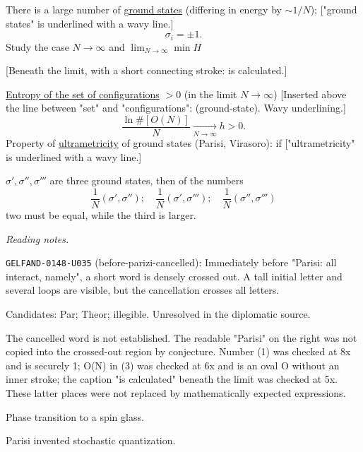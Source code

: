 There is a large number of \underline{ground states}
(differing in energy by $\sim1/N$);
["ground states" is underlined with a wavy line.]
\begin{equation*}
\sigma_i=\pm1.
\end{equation*}
Study the case $N\to\infty$ and $\displaystyle\lim_{N\to\infty}\min H$

[Beneath the limit, with a short connecting stroke: is calculated.]

\underline{Entropy of the set of configurations} $>0$ (in the limit $N\to\infty$)
[Inserted above the line between "set" and "configurations": (ground-state). Wavy underlining.]
\begin{equation*}
\frac{\ln\# [O(N)]}{N}\underset{N\to\infty}{\longrightarrow}h>0. \tag{3}
\end{equation*}
Property of \underline{ultrametricity} of ground states (Parisi, Virasoro): if
["ultrametricity" is underlined with a wavy line.]

$\sigma',\sigma'',\sigma'''$ are three ground states, then of the numbers
\begin{equation*}
\frac1N(\sigma',\sigma'');\quad
\frac1N(\sigma',\sigma''');\quad
\frac1N(\sigma'',\sigma''') \tag{4}
\end{equation*}
two must be equal, while the third is larger.

\par\smallskip\noindent\textit{Reading notes.}\par
\noindent\texttt{GELFAND-0148-U035} (before-parizi-cancelled): Immediately before "Parisi: all interact, namely", a short word is densely crossed out. A tall initial letter and several loops are visible, but the cancellation crosses all letters.\par
Candidates: Par; Theor; illegible. Unresolved in the diplomatic source.\par
The cancelled word is not established. The readable "Parisi" on the right was not copied into the crossed-out region by conjecture. Number (1) was checked at 8x and is securely 1; O(N) in (3) was checked at 6x and is an oval O without an inner stroke; the caption "is calculated" beneath the limit was checked at 5x. These latter places were not replaced by mathematically expected expressions.\par


Phase transition to a spin glass.

Parisi invented stochastic quantization.

